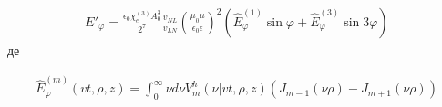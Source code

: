 

\begin{equation} \begin{aligned} \label{eq:ephi_kerr}
E'_\varphi = \frac{\epsilon_0 \chi_e^{(3)} A_0^3}{2^7}
\frac{v_{NL}}{v_{LN}}
\left( \frac{\mu_0 \mu}{\epsilon_0 \epsilon} \right)^2
\left(\hat{E}_\varphi^{(1)} \sin \varphi +
\hat{E}_\varphi^{(3)} \sin 3 \varphi \right)
\end{aligned} \end{equation}
%
де 

\begin{equation} \begin{aligned} \label{eq:ephi_norm}
\hat{E}_\varphi^{(m)} (vt, \rho, z) = 
\int_0^\infty \nu d \nu V_m^h (\nu | vt, \rho, z)
\left( J_{m-1} (\nu \rho) - J_{m+1} (\nu \rho) \right)
\end{aligned} \end{equation}

